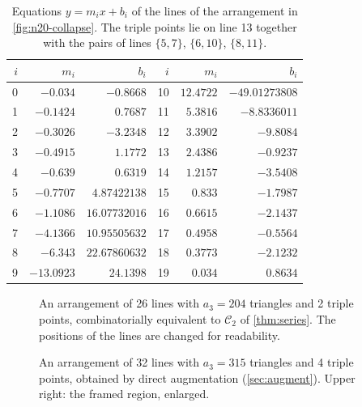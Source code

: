 \begin{table}[t]
\centering
\small
\caption{Equations $y=m_ix+b_i$ of the lines of the arrangement in \cref{fig:n20-collapse}. The triple points lie on line 13 together with the pairs of lines $\{5,7\}$, $\{6,10\}$, $\{8,11\}$.}
\label{tab:n20-collapse-lines}
\renewcommand{\arraystretch}{1.25}
\begin{tabular}{rrr@{\qquad}rrr}
\toprule
$i$ & $m_i$ & $b_i$ & $i$ & $m_i$ & $b_i$ \\
\midrule
0 & $-0.034$ & $-0.8668$ & 10 & $12.4722$ & $-49.01273808$ \\
1 & $-0.1424$ & $0.7687$ & 11 & $5.3816$ & $-8.8336011$ \\
2 & $-0.3026$ & $-3.2348$ & 12 & $3.3902$ & $-9.8084$ \\
3 & $-0.4915$ & $1.1772$ & 13 & $2.4386$ & $-0.9237$ \\
4 & $-0.639$ & $0.6319$ & 14 & $1.2157$ & $-3.5408$ \\
5 & $-0.7707$ & $4.87422138$ & 15 & $0.833$ & $-1.7987$ \\
6 & $-1.1086$ & $16.07732016$ & 16 & $0.6615$ & $-2.1437$ \\
7 & $-4.1366$ & $10.95505632$ & 17 & $0.4958$ & $-0.5564$ \\
8 & $-6.343$ & $22.67860632$ & 18 & $0.3773$ & $-2.1232$ \\
9 & $-13.0923$ & $24.1398$ & 19 & $0.034$ & $0.8634$ \\
\bottomrule
\end{tabular}
\end{table}

\begin{figure}[p]
\noindent
\caption{An arrangement of 26 lines with $a_3=204$ triangles and 2 triple points, combinatorially equivalent to $\mathcal C_2$ of \cref{thm:series}. The positions of the lines are changed for readability.}
\label{fig:n26}
\end{figure}

\begin{figure}[p]
\noindent\unskip{}
\caption{An arrangement of 32 lines with $a_3=315$ triangles and 4 triple points, obtained by direct augmentation (\cref{sec:augment}). Upper right: the framed region, enlarged.}
\label{fig:n32}
\end{figure}

